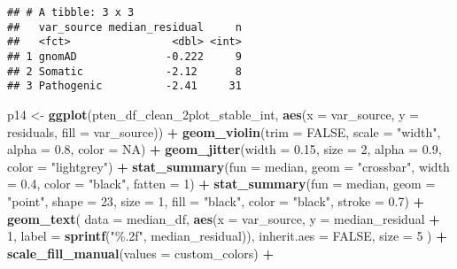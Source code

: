 \documentclass[
]{article}
\newenvironment{Shaded}{\begin{snugshade}}{\end{snugshade}}
\newcommand{\AttributeTok}[1]{\textcolor[rgb]{0.13,0.29,0.53}{#1}}
\newcommand{\ConstantTok}[1]{\textcolor[rgb]{0.56,0.35,0.01}{#1}}
\newcommand{\DecValTok}[1]{\textcolor[rgb]{0.00,0.00,0.81}{#1}}
\newcommand{\FloatTok}[1]{\textcolor[rgb]{0.00,0.00,0.81}{#1}}
\newcommand{\FunctionTok}[1]{\textcolor[rgb]{0.13,0.29,0.53}{\textbf{#1}}}
\newcommand{\NormalTok}[1]{#1}
\newcommand{\OtherTok}[1]{\textcolor[rgb]{0.56,0.35,0.01}{#1}}
\newcommand{\SpecialCharTok}[1]{\textcolor[rgb]{0.81,0.36,0.00}{\textbf{#1}}}
\newcommand{\StringTok}[1]{\textcolor[rgb]{0.31,0.60,0.02}{#1}}
\begin{document}
\begin{verbatim}
## # A tibble: 3 x 3
##   var_source median_residual     n
##   <fct>                <dbl> <int>
## 1 gnomAD              -0.222     9
## 2 Somatic             -2.12      8
## 3 Pathogenic          -2.41     31
\end{verbatim}

\begin{Shaded}
\begin{Highlighting}[]
\NormalTok{p14 }\OtherTok{\textless{}{-}} \FunctionTok{ggplot}\NormalTok{(pten\_df\_clean\_2plot\_stable\_int, }\FunctionTok{aes}\NormalTok{(}\AttributeTok{x =}\NormalTok{ var\_source, }\AttributeTok{y =}\NormalTok{ residuals, }\AttributeTok{fill =}\NormalTok{ var\_source)) }\SpecialCharTok{+}
  \FunctionTok{geom\_violin}\NormalTok{(}\AttributeTok{trim =} \ConstantTok{FALSE}\NormalTok{, }\AttributeTok{scale =} \StringTok{"width"}\NormalTok{, }\AttributeTok{alpha =} \FloatTok{0.8}\NormalTok{, }\AttributeTok{color =} \ConstantTok{NA}\NormalTok{) }\SpecialCharTok{+}
  \FunctionTok{geom\_jitter}\NormalTok{(}\AttributeTok{width =} \FloatTok{0.15}\NormalTok{, }\AttributeTok{size =} \DecValTok{2}\NormalTok{, }\AttributeTok{alpha =} \FloatTok{0.9}\NormalTok{, }\AttributeTok{color =} \StringTok{"lightgrey"}\NormalTok{) }\SpecialCharTok{+}
  \FunctionTok{stat\_summary}\NormalTok{(}\AttributeTok{fun =}\NormalTok{ median, }\AttributeTok{geom =} \StringTok{"crossbar"}\NormalTok{, }\AttributeTok{width =} \FloatTok{0.4}\NormalTok{, }\AttributeTok{color =} \StringTok{"black"}\NormalTok{, }\AttributeTok{fatten =} \DecValTok{1}\NormalTok{) }\SpecialCharTok{+}
  \FunctionTok{stat\_summary}\NormalTok{(}\AttributeTok{fun =}\NormalTok{ median, }\AttributeTok{geom =} \StringTok{"point"}\NormalTok{, }\AttributeTok{shape =} \DecValTok{23}\NormalTok{, }\AttributeTok{size =} \DecValTok{1}\NormalTok{, }\AttributeTok{fill =} \StringTok{"black"}\NormalTok{, }\AttributeTok{color =} \StringTok{"black"}\NormalTok{, }\AttributeTok{stroke =} \FloatTok{0.7}\NormalTok{) }\SpecialCharTok{+}
  \FunctionTok{geom\_text}\NormalTok{(}
    \AttributeTok{data =}\NormalTok{ median\_df,}
    \FunctionTok{aes}\NormalTok{(}\AttributeTok{x =}\NormalTok{ var\_source, }\AttributeTok{y =}\NormalTok{ median\_residual }\SpecialCharTok{+} \DecValTok{1}\NormalTok{, }\AttributeTok{label =} \FunctionTok{sprintf}\NormalTok{(}\StringTok{"\%.2f"}\NormalTok{, median\_residual)),}
    \AttributeTok{inherit.aes =} \ConstantTok{FALSE}\NormalTok{,}
    \AttributeTok{size =} \DecValTok{5}
\NormalTok{  ) }\SpecialCharTok{+}
  \FunctionTok{scale\_fill\_manual}\NormalTok{(}\AttributeTok{values =}\NormalTok{ custom\_colors) }\SpecialCharTok{+}

\end{Highlighting}
\end{Shaded}
\end{document}
